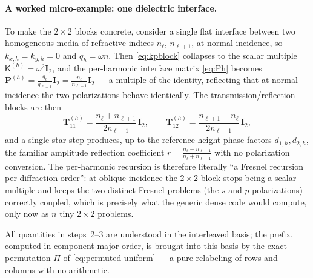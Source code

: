 \documentclass[11pt]{article}
\theoremstyle{remark}
\newcommand{\kp}{\mathsf{K}}
\newcommand{\Id}{\mathbf{I}}
\begin{document}
\paragraph{A worked micro-example: one dielectric interface.}
To make the $2\times2$ blocks concrete, consider a single flat interface
between two homogeneous media of refractive indices $n_\ell$, $n_{\ell+1}$, at
normal incidence, so $k_{x,h}=k_{y,h}=0$ and $q_h=\omega n$.  Then
\eqref{eq:kpblock} collapses to the scalar multiple
$\kp^{(h)}=\omega^2\Id_2$, and the per-harmonic interface matrix
\eqref{eq:Ph} becomes $\mathbf{P}^{(h)}=\tfrac{q_\ell}{q_{\ell+1}}\Id_2
=\tfrac{n_\ell}{n_{\ell+1}}\Id_2$ --- a multiple of the identity, reflecting
that at normal incidence the two polarizations behave identically.  The
transmission/reflection blocks are then
\begin{equation*}
\mathbf{T}^{(h)}_{11}=\frac{n_\ell+n_{\ell+1}}{2n_{\ell+1}}\,\Id_2,\qquad
\mathbf{T}^{(h)}_{12}=\frac{n_{\ell+1}-n_\ell}{2n_{\ell+1}}\,\Id_2,
\end{equation*}
and a single star step produces, up to the reference-height phase factors
$d_{1,h},d_{2,h}$, the familiar amplitude reflection coefficient
$r=\tfrac{n_\ell-n_{\ell+1}}{n_\ell+n_{\ell+1}}$ with no polarization
conversion.  The per-harmonic recursion is therefore literally ``a Fresnel
recursion per diffraction order'': at oblique incidence the $2\times2$ block
stops being a scalar multiple and keeps the two distinct Fresnel problems (the
$s$ and $p$ polarizations) correctly coupled, which is precisely what the
generic dense code would compute, only now as $n$ tiny $2\times2$ problems.

All quantities in steps~2--3 are understood in the interleaved basis; the
prefix, computed in component-major order, is brought into this basis by the
exact permutation $\Pi$ of \eqref{eq:permuted-uniform} --- a pure relabeling of
rows and columns with no arithmetic.
\end{document}
